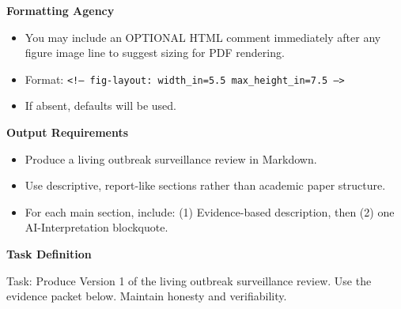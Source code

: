 \begin{tcolorbox}
\begin{tcolorbox}[
    enhanced,
    colback=gray!5,
    colframe=gray!20,
    boxrule=0pt,
    leftrule=3pt,
    arc=0pt,
    left=6pt, right=6pt, top=4pt, bottom=4pt
]
{\small\textbf{\textcolor{gray!60!black}{Formatting Agency}}}

\vspace{2pt}
{\small
\begin{itemize}[leftmargin=*, itemsep=-3pt]
    \item You may include an OPTIONAL HTML comment immediately after any figure image line to suggest sizing for PDF rendering.
    \item Format: \texttt{<!-- fig-layout: width\_in=5.5 max\_height\_in=7.5 -->}
    \item If absent, defaults will be used.
\end{itemize}
}
\end{tcolorbox}

\begin{tcolorbox}[
    enhanced,
    colback=gray!5,
    colframe=gray!20,
    boxrule=0pt,
    leftrule=3pt,
    arc=0pt,
    left=6pt, right=6pt, top=4pt, bottom=4pt
]
{\small\textbf{\textcolor{gray!60!black}{Output Requirements}}}

\vspace{2pt}
{\small
\begin{itemize}[leftmargin=*, itemsep=-3pt]
    \item Produce a living outbreak surveillance review in Markdown.
    \item Use descriptive, report-like sections rather than academic paper structure.
    \item For each main section, include: (1) Evidence-based description, then (2) one AI-Interpretation blockquote.
\end{itemize}
}
\end{tcolorbox}

\begin{tcolorbox}[
    enhanced,
    colback=gray!5,
    colframe=gray!20,
    boxrule=0pt,
    leftrule=3pt,
    arc=0pt,
    left=6pt, right=6pt, top=4pt, bottom=4pt
]
{\small\textbf{\textcolor{gray!60!black}{Task Definition}}}

\vspace{2pt}
{\small
Task: Produce Version 1 of the living outbreak surveillance review.
Use the evidence packet below. Maintain honesty and verifiability.

\vspace{1em}

}
\end{tcolorbox}
\end{tcolorbox}
